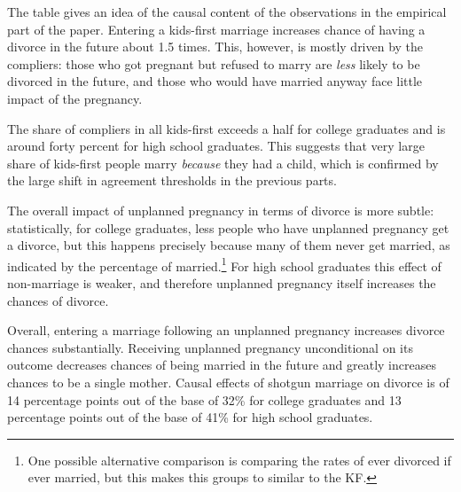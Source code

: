 \documentclass[12pt,letter]{article}
\begin{document}
The table gives an idea of the causal content of the observations in the empirical part of the paper. Entering a kids-first marriage  increases chance of having a divorce in the future about 1.5 times. This, however, is mostly driven by the compliers: those who got pregnant but refused to marry are \textit{less} likely to be divorced in the future, and those who would have married anyway face little impact of the pregnancy.

The share of compliers in all kids-first exceeds a half for college graduates and is around forty percent for high school graduates. This suggests that very large share of kids-first people marry \emph{because} they had a child, which is confirmed by the large shift in agreement thresholds in the previous parts.

The overall impact of unplanned pregnancy in terms of divorce is more subtle: statistically, for college graduates, less people who have unplanned pregnancy get a divorce, but this happens precisely because many of them never get married, as indicated by the percentage of married.\footnote{One possible alternative comparison is comparing the rates of ever divorced if ever married, but this makes this groups to similar to the KF.} For high school graduates this effect of non-marriage is weaker, and therefore unplanned pregnancy itself increases the chances of divorce.  

Overall, entering a marriage following an unplanned pregnancy increases divorce chances substantially. Receiving unplanned pregnancy unconditional on its outcome decreases chances of being married in the future and greatly increases chances to be a single mother. Causal effects of shotgun marriage on divorce is of 14 percentage points out of the base of 32\% for college graduates and 13 percentage points out of the base of 41\% for high school graduates. 


\end{document}
